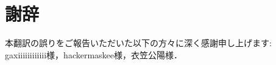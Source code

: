 \documentclass[12pt,titlepage,twoside,openright,dvipdfmx]{jsbook}
\theoremstyle{definition}
\begin{document}

\section*{謝辞}

本翻訳の誤りをご報告いただいた以下の方々に深く感謝申し上げます: gaxiiiiiiiiiiii様，hackermaskee様，衣笠公陽様．
\end{document}
